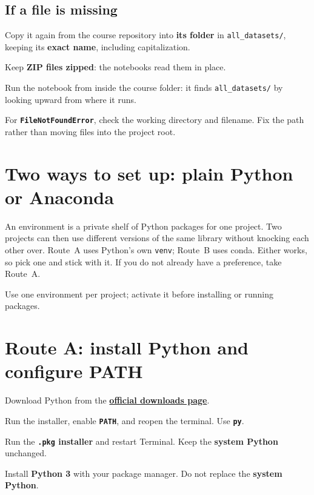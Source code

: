 \subsection{If a file is missing}

\begin{utpsteps}
  \item Copy it again from the course repository into \textbf{its folder} in \texttt{all\_datasets/}, keeping its \textbf{exact name}, including capitalization.
  \item Keep \textbf{ZIP files zipped}: the notebooks read them in place.
  \item Run the notebook from inside the course folder: it finds \texttt{all\_datasets/} by looking upward from where it runs.
\end{utpsteps}

\begin{pitfall}
For \textbf{\texttt{FileNotFoundError}}, check the working directory and filename. Fix the path rather than moving files into the project root.
\end{pitfall}

\section{Two ways to set up: plain Python or Anaconda}

An environment is a private shelf of Python packages for one project. Two projects can then use different versions of the same library without knocking each other over. Route~A uses Python's own \texttt{venv}; Route~B uses conda. Either works, so pick one and stick with it. If you do not already have a preference, take Route~A.

\begin{keyidea}
Use one environment per project; activate it before installing or running packages.
\end{keyidea}

\section{Route A: install Python and configure PATH}

Download Python from the \href{https://www.python.org/downloads/}{\textbf{official downloads page}}.

\begin{description}[leftmargin=1.15in,style=nextline]
  \item[Windows] Run the installer, enable \textbf{\texttt{PATH}}, and reopen the terminal. Use \textbf{\texttt{py}}.
  \item[macOS] Run the \textbf{\texttt{.pkg} installer} and restart Terminal. Keep the \textbf{system Python} unchanged.
  \item[Linux] Install \textbf{Python 3} with your package manager. Do not replace the \textbf{system Python}.
\end{description}

